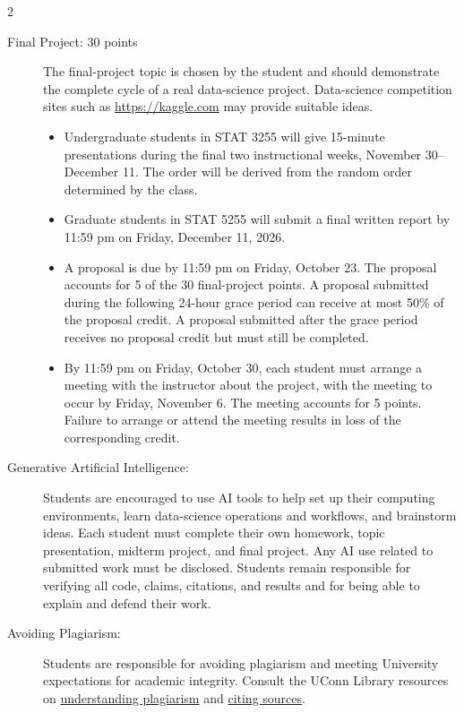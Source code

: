 \documentclass{article}
\begin{document}
\begin{multicols}{2}
\begin{description}
\item[Final Project: 30 points]
  The final-project topic is chosen by the student and should demonstrate the
  complete cycle of a real data-science project. Data-science competition
  sites such as \url{https://kaggle.com} may provide suitable ideas.

\begin{itemize}
\item Undergraduate students in STAT 3255 will give 15-minute presentations during
  the final two instructional weeks, November 30--December 11. The order will
  be derived from the random order determined by the class.

\item Graduate students in STAT 5255 will submit a final written report by
  11:59 pm on Friday, December 11, 2026.

\item A proposal is due by 11:59 pm on Friday, October 23. The proposal
  accounts for 5 of the 30 final-project points. A proposal submitted during
  the following 24-hour grace period can receive at most 50\% of the proposal
  credit. A proposal submitted after the grace period receives no proposal
  credit but must still be completed.

\item By 11:59 pm on Friday, October 30, each student must arrange a meeting with
  the instructor about the project, with the meeting to occur by Friday,
  November 6. The meeting accounts for 5 points. Failure to arrange or attend
  the meeting results in loss of the corresponding credit.
\end{itemize}

\item[Generative Artificial Intelligence:]
  Students are encouraged to use AI tools to help set up their computing
  environments, learn data-science operations and workflows, and brainstorm
  ideas. Each student must complete their own homework, topic presentation,
  midterm project, and final project. Any AI use related to submitted work
  must be disclosed. Students remain responsible for verifying
  all code, claims, citations, and results and for being able to explain and
  defend their work.

\item[Avoiding Plagiarism:]
  Students are responsible for avoiding plagiarism and meeting University
  expectations for academic integrity. Consult the UConn Library resources on
  \href{https://lib.uconn.edu/services/ask/get-help/writing/plagiarism-resources/}{understanding plagiarism} and
  \href{https://guides.lib.uconn.edu/quickstart}{citing sources}.


\end{description}
\end{multicols}
\end{document}
